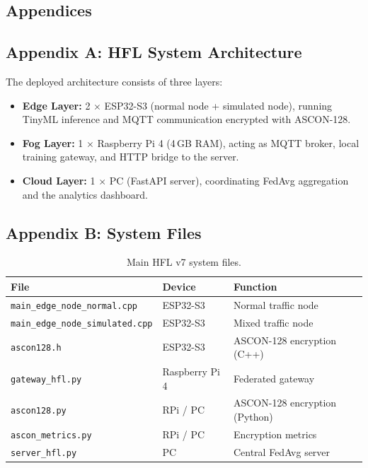 \begin{appendix}
\chapter{Appendices}\label{chap:ann1}

\section{Appendix A: HFL System Architecture}
\label{anx:arquitectura}

The deployed architecture consists of three layers:

\begin{itemize}
    \item \textbf{Edge Layer:} 2 $\times$ ESP32-S3 (normal node + simulated node), running TinyML inference and MQTT communication encrypted with ASCON-128.
    \item \textbf{Fog Layer:} 1 $\times$ Raspberry Pi 4 (4\,GB RAM), acting as MQTT broker, local training gateway, and HTTP bridge to the server.
    \item \textbf{Cloud Layer:} 1 $\times$ PC (FastAPI server), coordinating FedAvg aggregation and the analytics dashboard.
\end{itemize}

\section{Appendix B: System Files}
\label{anx:archivos}

\begin{table}[H]
\centering
\caption{Main HFL v7 system files.}
\small
\begin{tabular}{l l l}
\toprule
\textbf{File} & \textbf{Device} & \textbf{Function} \\
\midrule
\texttt{main\_edge\_node\_normal.cpp}    & ESP32-S3 & Normal traffic node \\
\texttt{main\_edge\_node\_simulated.cpp} & ESP32-S3 & Mixed traffic node \\
\texttt{ascon128.h}                      & ESP32-S3 & ASCON-128 encryption (C++) \\
\texttt{gateway\_hfl.py}                 & Raspberry Pi 4 & Federated gateway \\
\texttt{ascon128.py}                     & RPi / PC & ASCON-128 encryption (Python) \\
\texttt{ascon\_metrics.py}               & RPi / PC & Encryption metrics \\
\texttt{server\_hfl.py}                  & PC & Central FedAvg server \\
\bottomrule
\end{tabular}
\end{table}


\end{appendix}

